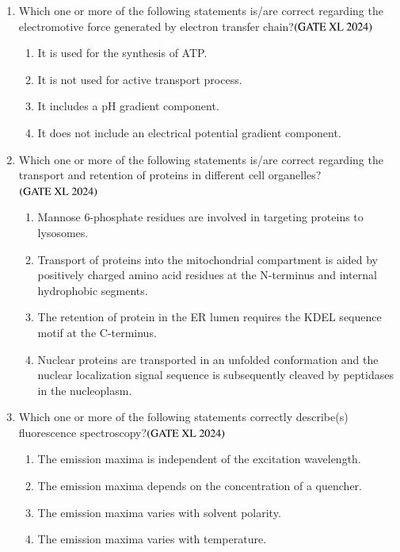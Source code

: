 \documentclass[journal]{IEEEtran}
\begin{document}
\begin{enumerate}
    \item Which one or more of the following statements is/are correct regarding the electromotive force generated by electron transfer chain?\hfill $\left(\text{GATE XL 2024}\right)$
    \begin{enumerate}
            \item It is used for the synthesis of ATP.
            \item It is not used for active transport process.
            \item It includes a pH gradient component.
            \item It does not include an electrical potential gradient component.
    \end{enumerate}

    \item Which one or more of the following statements is/are correct regarding the transport and retention of proteins in different cell organelles?\hfill $\left(\text{GATE XL 2024}\right)$
    \begin{enumerate}
            \item Mannose 6-phosphate residues are involved in targeting proteins to lysosomes.
            \item Transport of proteins into the mitochondrial compartment is aided by positively charged amino acid residues at the N-terminus and internal hydrophobic segments.
            \item The retention of protein in the ER lumen requires the KDEL sequence motif at the C-terminus.
            \item Nuclear proteins are transported in an unfolded conformation and the nuclear localization signal sequence is subsequently cleaved by peptidases in the nucleoplasm.
    \end{enumerate}

    \item Which one or more of the following statements correctly describe(s) fluorescence spectroscopy?\hfill $\left(\text{GATE XL 2024}\right)$
    \begin{enumerate}
            \item The emission maxima is independent of the excitation wavelength.
            \item The emission maxima depends on the concentration of a quencher.
            \item The emission maxima varies with solvent polarity.
            \item The emission maxima varies with temperature.
    \end{enumerate}


\end{enumerate}
\end{document}
